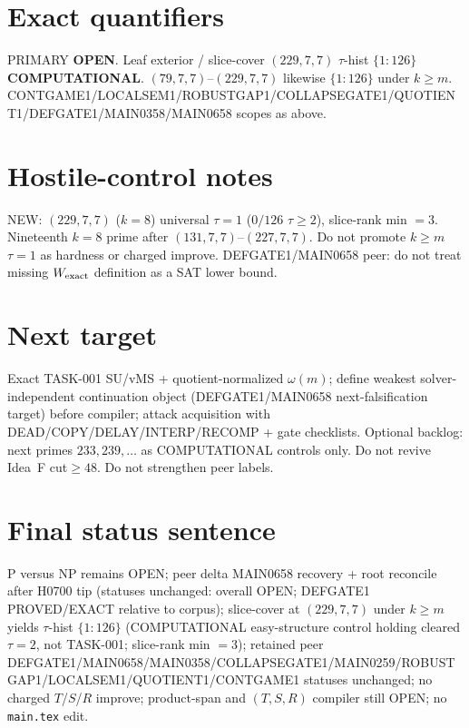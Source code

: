 \documentclass[11pt]{article}
\begin{document}
\section*{Exact quantifiers}
PRIMARY \textbf{OPEN}. Leaf exterior / slice-cover $(229,7,7)$ $\tau$-hist $\{1{:}126\}$ \textbf{COMPUTATIONAL}.
$(79,7,7)$--$(229,7,7)$ likewise $\{1{:}126\}$ under $k{\ge}m$. CONTGAME1/LOCALSEM1/ROBUSTGAP1/COLLAPSEGATE1/QUOTIENT1/DEFGATE1/MAIN0358/MAIN0658 scopes as above.

\section*{Hostile-control notes}
NEW: $(229,7,7)$ ($k{=}8$) universal $\tau{=}1$ ($0/126$ $\tau{\ge}2$), slice-rank min $=3$.
Nineteenth $k{=}8$ prime after $(131,7,7)$--$(227,7,7)$.
Do not promote $k{\ge}m$ $\tau{=}1$ as hardness or charged improve.
DEFGATE1/MAIN0658 peer: do not treat missing $W_{\rm exact}$ definition as a SAT lower bound.

\section*{Next target}
Exact TASK-001 SU/vMS + quotient-normalized $\omega(m)$; define weakest solver-independent
continuation object (DEFGATE1/MAIN0658 next-falsification target) before compiler;
attack acquisition with DEAD/COPY/DELAY/INTERP/RECOMP + gate checklists.
Optional backlog: next primes $233,239,\ldots$ as COMPUTATIONAL controls only.
Do not revive Idea~F cut$\ge48$. Do not strengthen peer labels.

\section*{Final status sentence}
P versus NP remains OPEN; peer delta MAIN0658 recovery + root reconcile after H0700 tip (statuses unchanged: overall OPEN; DEFGATE1 PROVED/EXACT relative to corpus); slice-cover at $(229,7,7)$ under $k{\ge}m$ yields $\tau$-hist $\{1{:}126\}$ (COMPUTATIONAL easy-structure control holding cleared $\tau{=}2$, not TASK-001; slice-rank min $=3$); retained peer DEFGATE1/MAIN0658/MAIN0358/COLLAPSEGATE1/MAIN0259/ROBUSTGAP1/LOCALSEM1/QUOTIENT1/CONTGAME1 statuses unchanged; no charged $T$/$S$/$R$ improve; product-span and $(T,S,R)$ compiler still OPEN; no \texttt{main.tex} edit.
\end{document}
